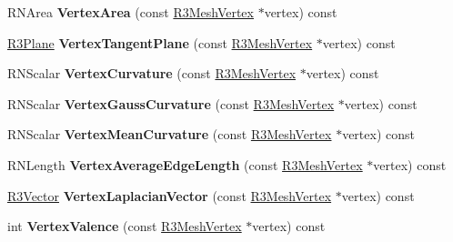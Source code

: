 \begin{DoxyCompactItemize}
\item 
R\+N\+Area {\bfseries Vertex\+Area} (const \hyperlink{class_r3_mesh_vertex}{R3\+Mesh\+Vertex} $\ast$vertex) const \hypertarget{class_r3_mesh_ada6bb10e165e677155c75c5963a1dfef}{}\label{class_r3_mesh_ada6bb10e165e677155c75c5963a1dfef}

\item 
\hyperlink{class_r3_plane}{R3\+Plane} {\bfseries Vertex\+Tangent\+Plane} (const \hyperlink{class_r3_mesh_vertex}{R3\+Mesh\+Vertex} $\ast$vertex) const \hypertarget{class_r3_mesh_aeeb61cbad1754fde7d49f598f8d094ec}{}\label{class_r3_mesh_aeeb61cbad1754fde7d49f598f8d094ec}

\item 
R\+N\+Scalar {\bfseries Vertex\+Curvature} (const \hyperlink{class_r3_mesh_vertex}{R3\+Mesh\+Vertex} $\ast$vertex) const \hypertarget{class_r3_mesh_a219aad725f9539397e5257ead59f43c3}{}\label{class_r3_mesh_a219aad725f9539397e5257ead59f43c3}

\item 
R\+N\+Scalar {\bfseries Vertex\+Gauss\+Curvature} (const \hyperlink{class_r3_mesh_vertex}{R3\+Mesh\+Vertex} $\ast$vertex) const \hypertarget{class_r3_mesh_a5658160da7dcecad81de8d6d66ee1ba3}{}\label{class_r3_mesh_a5658160da7dcecad81de8d6d66ee1ba3}

\item 
R\+N\+Scalar {\bfseries Vertex\+Mean\+Curvature} (const \hyperlink{class_r3_mesh_vertex}{R3\+Mesh\+Vertex} $\ast$vertex) const \hypertarget{class_r3_mesh_ae103f92239da939eac4d48976471c6fa}{}\label{class_r3_mesh_ae103f92239da939eac4d48976471c6fa}

\item 
R\+N\+Length {\bfseries Vertex\+Average\+Edge\+Length} (const \hyperlink{class_r3_mesh_vertex}{R3\+Mesh\+Vertex} $\ast$vertex) const \hypertarget{class_r3_mesh_a371c627f2d40d45fe2bbf149d793f635}{}\label{class_r3_mesh_a371c627f2d40d45fe2bbf149d793f635}

\item 
\hyperlink{class_r3_vector}{R3\+Vector} {\bfseries Vertex\+Laplacian\+Vector} (const \hyperlink{class_r3_mesh_vertex}{R3\+Mesh\+Vertex} $\ast$vertex) const \hypertarget{class_r3_mesh_aef07bacbdac010fde3a2e50296a96a2f}{}\label{class_r3_mesh_aef07bacbdac010fde3a2e50296a96a2f}

\item 
int {\bfseries Vertex\+Valence} (const \hyperlink{class_r3_mesh_vertex}{R3\+Mesh\+Vertex} $\ast$vertex) const \hypertarget{class_r3_mesh_a12ae3199e42a7e962fef827c2f4e8591}{}\label{class_r3_mesh_a12ae3199e42a7e962fef827c2f4e8591}


\end{DoxyCompactItemize}

